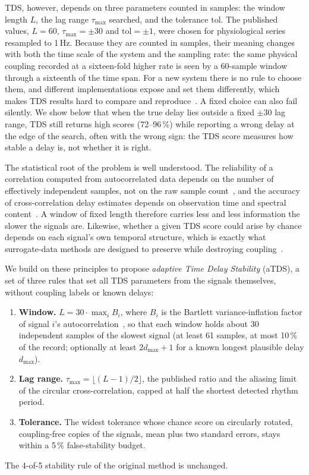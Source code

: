 \documentclass[11pt,a4paper]{article}
\begin{document}
TDS, however, depends on three parameters counted in samples: the window length $L$, the lag range $\tau_{\max}$ searched, and the tolerance $\mathrm{tol}$. The published values, $L = 60$, $\tau_{\max} = \pm 30$ and $\mathrm{tol} = \pm 1$, were chosen for physiological series resampled to 1\,Hz. Because they are counted in samples, their meaning changes with both the time scale of the system and the sampling rate: the same physical coupling recorded at a sixteen-fold higher rate is seen by a 60-sample window through a sixteenth of the time span. For a new system there is no rule to choose them, and different implementations expose and set them differently, which makes TDS results hard to compare and reproduce~\cite{Steinbrinker2024TdspyOpensource}. A fixed choice can also fail silently. We show below that when the true delay lies outside a fixed $\pm30$ lag range, TDS still returns high scores (72--96\,\%) while reporting a wrong delay at the edge of the search, often with the wrong sign: the TDS score measures how stable a delay is, not whether it is right.

The statistical root of the problem is well understood. The reliability of a correlation computed from autocorrelated data depends on the number of effectively independent samples, not on the raw sample count~\cite{Bartlett1946TheoreticalSpecification,Bayley1946EffectiveNumber,Pyper1998ComparisonMethods,Afyouni2019EffectiveDegrees}, and the accuracy of cross-correlation delay estimates depends on observation time and spectral content~\cite{Knapp1976GeneralizedCorrelation,Carter1987CoherenceTime}. A window of fixed length therefore carries less and less information the slower the signals are. Likewise, whether a given TDS score could arise by chance depends on each signal's own temporal structure, which is exactly what surrogate-data methods are designed to preserve while destroying coupling~\cite{Theiler1992TestingNonlinearity,Schreiber2000SurrogateTime,Lancaster2018SurrogateData}.

We build on these principles to propose \emph{adaptive Time Delay Stability} (aTDS), a set of three rules that set all TDS parameters from the signals themselves, without coupling labels or known delays:
\begin{enumerate}
\item \textbf{Window.} $L = 30 \cdot \max_i B_i$, where $B_i$ is the Bartlett variance-inflation factor of signal $i$'s autocorrelation~\cite{Bartlett1946TheoreticalSpecification}, so that each window holds about 30 independent samples of the slowest signal (at least 61 samples, at most 10\,\% of the record; optionally at least $2 d_{\max} + 1$ for a known longest plausible delay $d_{\max}$).
\item \textbf{Lag range.} $\tau_{\max} = \lfloor (L-1)/2 \rfloor$, the published ratio and the aliasing limit of the circular cross-correlation, capped at half the shortest detected rhythm period.
\item \textbf{Tolerance.} The widest tolerance whose chance score on circularly rotated, coupling-free copies of the signals, mean plus two standard errors, stays within a 5\,\% false-stability budget.
\end{enumerate}
The 4-of-5 stability rule of the original method is unchanged.
\end{document}
